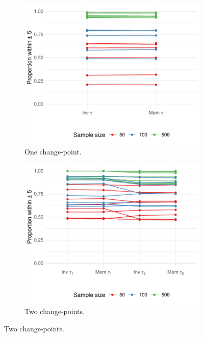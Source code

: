 \begin{figure}[ht]
    \centering
     \begin{subfigure}[b]{0.45\textwidth}
         \centering
         \includegraphics[width=\textwidth]{exp1_plplot.pdf}
         \caption{One change-point.}
         \label{fig:exp1plplot}
     \end{subfigure}
     \hfill
    \begin{subfigure}[b]{0.45\textwidth}
         \centering
         \includegraphics[width=\textwidth]{exp2_plplot.pdf}
         \caption{Two change-points.}
         \label{fig:exp2plplot}
     \end{subfigure}

\end{figure}
